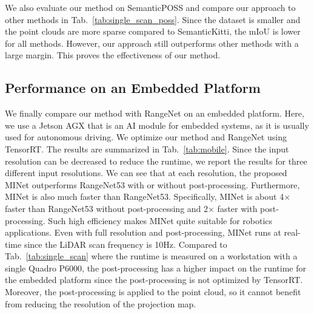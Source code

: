 \documentclass[letterpaper, 10 pt, journal, twoside]{ieeetran}
\newcommand{\tabref}[1]{Tab.~\ref{#1}}
\newcommand{\todo}[1]{#1}
\begin{document}
We also evaluate our method on SemanticPOSS \cite{pan2020semanticposs} and compare our approach to other methods in \tabref{tab:single_scan_poss}. Since the dataset is smaller and the point clouds are more sparse compared to SemanticKitti, the mIoU is lower for all methods. However, our approach still outperforms other methods with a large margin.
This proves the effectiveness of our method.








\subsection{Performance on an Embedded Platform}
We finally compare our method with RangeNet on an embedded platform. 
Here, we use a Jetson AGX that is an AI module for embedded systems, as it is usually used for autonomous driving.
\todo{We optimize our method and RangeNet using TensorRT.}
The results are summarized in \tabref{tab:mobile}.
Since the input resolution can be decreased to reduce the runtime, we report the results for three different input resolutions.
We can see that at each resolution, the proposed MINet outperforms RangeNet53 \cite{milioto2019rangenet++} with or without post-processing. Furthermore, MINet is also much faster than RangeNet53.
Specifically, MINet is about 4$\times$ faster than RangeNet53 without post-processing and 2$\times$ faster with post-processing.
Such high efficiency makes MINet quite suitable for robotics applications.
Even with full resolution and post-processing, MINet runs at real-time since the LiDAR scan frequency is 10Hz. 
Compared to \tabref{tab:single_scan} where the runtime is measured on a workstation with a single Quadro P6000, the post-processing has a higher impact on the runtime for the embedded platform since the post-processing is not optimized by TensorRT.
Moreover, the post-processing is applied to the point cloud, so it cannot benefit from reducing the resolution of the projection map.
\end{document}
